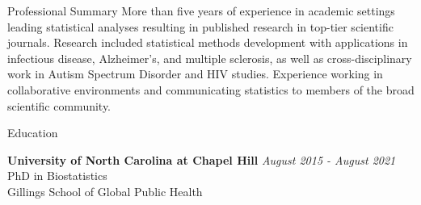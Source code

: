 \documentclass{resume} %
\begin{document}

\begin{rSection}{Professional Summary}
More than five years of experience in academic settings leading statistical analyses resulting in published research in top-tier scientific journals.  Research included statistical methods development with applications in infectious disease, Alzheimer's, and multiple sclerosis, as well as cross-disciplinary work in Autism Spectrum Disorder and HIV studies.  Experience working in collaborative environments and communicating statistics to members of the broad scientific community.
\end{rSection}


\begin{rSection}{Education}

{\bf University of North Carolina at Chapel Hill} \hfill {\em August 2015 - August 2021} 
\\ PhD in Biostatistics
\\ Gillings School of Global Public Health

\end{rSection}
\end{document}
